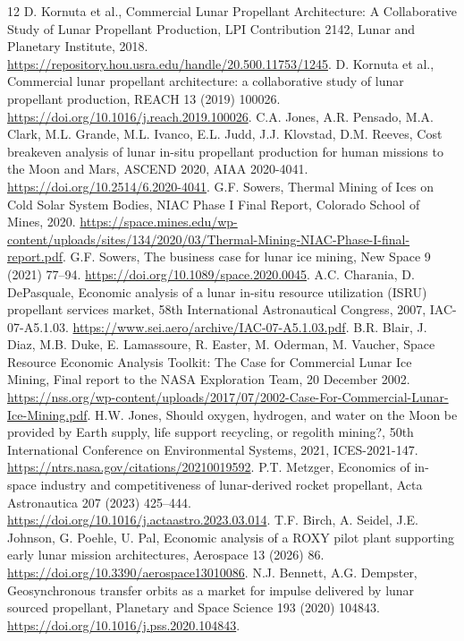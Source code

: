 \documentclass[final,5p,times,twocolumn]{elsarticle}
\begin{document}
\begin{thebibliography}{12}
 D. Kornuta et al., Commercial Lunar Propellant Architecture: A Collaborative Study of Lunar Propellant Production, LPI Contribution 2142, Lunar and Planetary Institute, 2018. \url{https://repository.hou.usra.edu/handle/20.500.11753/1245}.
 D. Kornuta et al., Commercial lunar propellant architecture: a collaborative study of lunar propellant production, REACH 13 (2019) 100026. \url{https://doi.org/10.1016/j.reach.2019.100026}.
 C.A. Jones, A.R. Pensado, M.A. Clark, M.L. Grande, M.L. Ivanco, E.L. Judd, J.J. Klovstad, D.M. Reeves, Cost breakeven analysis of lunar in-situ propellant production for human missions to the Moon and Mars, ASCEND 2020, AIAA 2020-4041. \url{https://doi.org/10.2514/6.2020-4041}.
 G.F. Sowers, Thermal Mining of Ices on Cold Solar System Bodies, NIAC Phase I Final Report, Colorado School of Mines, 2020. \url{https://space.mines.edu/wp-content/uploads/sites/134/2020/03/Thermal-Mining-NIAC-Phase-I-final-report.pdf}.
 G.F. Sowers, The business case for lunar ice mining, New Space 9 (2021) 77--94. \url{https://doi.org/10.1089/space.2020.0045}.
 A.C. Charania, D. DePasquale, Economic analysis of a lunar in-situ resource utilization (ISRU) propellant services market, 58th International Astronautical Congress, 2007, IAC-07-A5.1.03. \url{https://www.sei.aero/archive/IAC-07-A5.1.03.pdf}.
 B.R. Blair, J. Diaz, M.B. Duke, E. Lamassoure, R. Easter, M. Oderman, M. Vaucher, Space Resource Economic Analysis Toolkit: The Case for Commercial Lunar Ice Mining, Final report to the NASA Exploration Team, 20 December 2002. \url{https://nss.org/wp-content/uploads/2017/07/2002-Case-For-Commercial-Lunar-Ice-Mining.pdf}.
 H.W. Jones, Should oxygen, hydrogen, and water on the Moon be provided by Earth supply, life support recycling, or regolith mining?, 50th International Conference on Environmental Systems, 2021, ICES-2021-147. \url{https://ntrs.nasa.gov/citations/20210019592}.
 P.T. Metzger, Economics of in-space industry and competitiveness of lunar-derived rocket propellant, Acta Astronautica 207 (2023) 425--444. \url{https://doi.org/10.1016/j.actaastro.2023.03.014}.
 T.F. Birch, A. Seidel, J.E. Johnson, G. Poehle, U. Pal, Economic analysis of a ROXY pilot plant supporting early lunar mission architectures, Aerospace 13 (2026) 86. \url{https://doi.org/10.3390/aerospace13010086}.
 N.J. Bennett, A.G. Dempster, Geosynchronous transfer orbits as a market for impulse delivered by lunar sourced propellant, Planetary and Space Science 193 (2020) 104843. \url{https://doi.org/10.1016/j.pss.2020.104843}.
\end{thebibliography}
\end{document}
